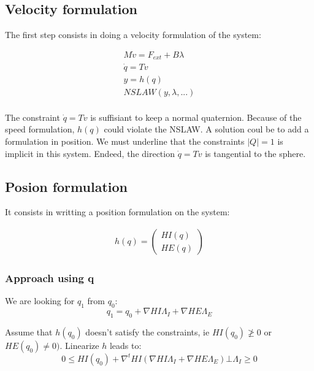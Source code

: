 \subsection{Velocity formulation}

The first step consists in doing a velocity formulation of the system:

\begin{equation}
\label{NE_Dyn1}
\begin{array}{l}
  M \dot v = F_{ext}+B \lambda \\
  \dot q = T v\\
  y=h(q) \\
  NSLAW(y,\lambda,...)\\
\end{array}
\end{equation}

The constraint $\dot q = T v$ is suffisiant to keep a normal quaternion. Because of the speed formulation, $h(q)$ could violate the NSLAW. A solution coul be to add a formulation in position. We must underline that the constraints $\mid Q \mid = 1$ is implicit in this system. Endeed, the direction  $\dot q = T v$ is tangential to the sphere.


\subsection{Posion formulation}

It consists in writting a position formulation on the system:

\begin{equation}
\label{NE_Dyn1}
\begin{array}{l}
h(q) = \left(\begin{array}{l}
  HI(q)\\HE(q)
\end{array}\right)
\end{array}
\end{equation}

\subsubsection{Approach using q}

We are looking for $q_1$ from $q_0$:\\
\begin{equation}
  q_1=q_0+\nabla HI \Lambda _I + \nabla HE \Lambda _E
\end{equation}

Assume that $h(q_0)$ doesn't satisfy the constraints, ie $ HI(q_0) \ngeq 0$ or $ HE(q_0) \neq 0)$. Linearize $h$ leads to:\\
\begin{equation}
  0 \leq HI(q_0) + \nabla ^t HI (\nabla HI  \Lambda _I + \nabla HE \Lambda _E) \bot \Lambda _I \geq 0
\end{equation}

